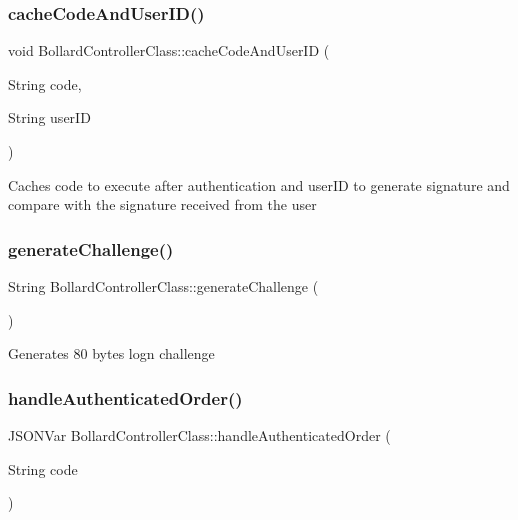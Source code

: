 \subsubsection{\texorpdfstring{cache\+Code\+And\+User\+I\+D()}{cacheCodeAndUserID()}}
{\footnotesize\ttfamily void Bollard\+Controller\+Class\+::cache\+Code\+And\+User\+ID (\begin{DoxyParamCaption}\item[{String}]{code,  }\item[{String}]{user\+ID }\end{DoxyParamCaption})\hspace{0.3cm}{\ttfamily [private]}}

Caches code to execute after authentication and user\+ID to generate signature and compare with the signature received from the user \mbox{\label{class_bollard_controller_class_a7463ffa0ae3c7f4a34ee18d06d158be4}} 
\subsubsection{\texorpdfstring{generate\+Challenge()}{generateChallenge()}}
{\footnotesize\ttfamily String Bollard\+Controller\+Class\+::generate\+Challenge (\begin{DoxyParamCaption}{ }\end{DoxyParamCaption})\hspace{0.3cm}{\ttfamily [private]}}

Generates 80 bytes logn challenge \mbox{\label{class_bollard_controller_class_add52fb47bb3e0e0724f9e815be177ba1}} 
\subsubsection{\texorpdfstring{handle\+Authenticated\+Order()}{handleAuthenticatedOrder()}}
{\footnotesize\ttfamily J\+S\+O\+N\+Var Bollard\+Controller\+Class\+::handle\+Authenticated\+Order (\begin{DoxyParamCaption}\item[{String}]{code }\end{DoxyParamCaption})\hspace{0.3cm}{\ttfamily [private]}}

